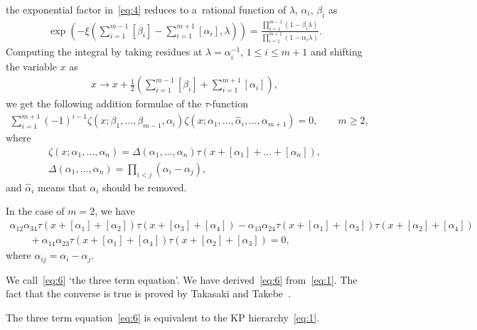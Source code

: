 the exponential factor in~\eqref{eq:4} reduces to a~rational function of $\lambda$, $\alpha_i$, $\beta_i$ as
\begin{gather*}
\exp\left(-\xi\left(\sum_{i=1}^{m-1}[\beta_i]-\sum_{i=1}^{m+1}[\alpha_i],\lambda\right)\right)
=\frac{\prod\limits_{i=1}^{m-1}(1-\beta_i\lambda)}{\prod\limits_{i=1}^{m+1}
(1-\alpha_i\lambda)}.
\end{gather*}
Computing the integral by taking residues at $\lambda=\alpha_i^{-1}$, $1\le i\le m+1$ \cite{M1} and
shifting the variable $x$ as
\begin{gather*}
x\rightarrow x+\frac{1}{2}\left(\sum_{i=1}^{m-1}[\beta_i]+\sum_{i=1}^{m+1}[\alpha_i]\right),
\end{gather*}
we get the following addition formulae of the $\tau$-function~\cite{SS1}
\begin{gather}
\sum_{i=1}^{m+1}(-1)^{i-1}\zeta(x;\beta_1,\dots,\beta_{m-1},\alpha_i)\zeta(x;\alpha_1,\dots,\hat{\alpha}
_i,\dots,\alpha_{m+1})=0,\qquad  m\ge2,
\label{eq:5}
\end{gather}
where
\begin{gather*}
\zeta(x;\alpha_1,\dots,\alpha_{n})=\Delta(\alpha_1,\dots,\alpha_{n})\tau(x+[\alpha_1]+\dots+[\alpha_{n}]),
\\
\Delta(\alpha_1,\dots,\alpha_n)=\prod_{i<j}(\alpha_i-\alpha_j),
\end{gather*}
and $\hat{\alpha}_i$ means that $\alpha_i$ should be removed.
\begin{example}\label{example1}
In the case of $m=2$, we have
\begin{gather}
\alpha_{12}\alpha_{34}\tau(x+[\alpha_1]+[\alpha_2])\tau(x+[\alpha_3]+[\alpha_4])
-\alpha_{13}\alpha_{24}\tau(x+[\alpha_1]+[\alpha_3])\tau(x+[\alpha_2]+[\alpha_4])
\nonumber
\\
\qquad
{}+\alpha_{14}\alpha_{23}\tau(x+[\alpha_1]+[\alpha_4])\tau(x+[\alpha_2]+[\alpha_3])=0,
\label{eq:6}
\end{gather}
where $\alpha_{ij}=\alpha_i-\alpha_j$.
\end{example}

We call~\eqref{eq:6} `the three term equation'.
We have derived~\eqref{eq:6} from~\eqref{eq:1}.
The fact that the converse is true is proved by Takasaki and Takebe~\cite{TT1}.
\begin{theorem}[\cite{TT1}] \label{theorem1} The three term equation~\eqref{eq:6} is equivalent to the KP hierarchy~\eqref{eq:1}.
\end{theorem}

